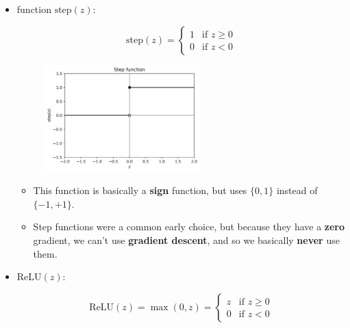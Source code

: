         \begin{itemize}
            \item {} function $\text{step}(z)$:
            
                \begin{equation}
                    \text{step}(z) 
                    =
                    \begin{cases}
                      1 & \text{if $z \geq 0$}\\
                      0 & \text{if $z < 0$}
                    \end{cases}
                \end{equation}
                
                \begin{figure}[H]
                    \centering
                    \includegraphics[width=60mm,scale=0.4]{images/nn_images/step_fn.png}
                \end{figure}
                
                \begin{itemize}
                    \item This function is basically a \textbf{sign} function, but uses $\{0, 1\}$ instead of $\{-1, +1\}$.
                    
                    \item Step functions were a common early choice, but because they have a \textbf{zero} gradient, we can't use \textbf{gradient descent}, and so we basically \textbf{never} use them.
                \end{itemize}
            
            
            \item {} ReLU$(z)$:
            
                \begin{equation}
                    \text{ReLU}(z) 
                    =
                    \max(0,z)
                    =
                    \begin{cases}
                      z & \text{if $z \geq 0$}\\
                      0 & \text{if $z < 0$}
                    \end{cases}
                \end{equation}
                

\end{itemize}
